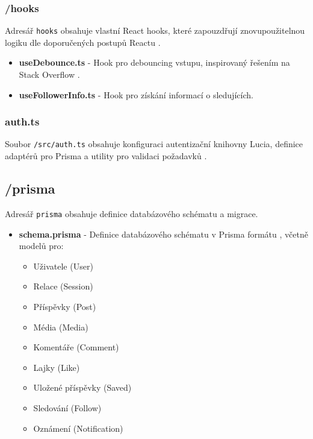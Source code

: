 \documentclass[12pt]{article}
\begin{document}
\subsubsection{/hooks}

Adresář \texttt{hooks} obsahuje vlastní React hooks, které zapouzdřují znovupoužitelnou logiku dle doporučených postupů Reactu \citep{React2023Hooks}.

\begin{itemize}
  \item \textbf{useDebounce.ts} - Hook pro debouncing vstupu, inspirovaný řešením na Stack Overflow \citep{StackOverflow2021}.
  \item \textbf{useFollowerInfo.ts} - Hook pro získání informací o sledujících.
\end{itemize}

\subsubsection{auth.ts}

Soubor \texttt{/src/auth.ts} obsahuje konfiguraci autentizační knihovny Lucia, definice adaptérů pro Prisma a utility pro validaci požadavků \citep{Lucia2023}.

\subsection{/prisma}

Adresář \texttt{prisma} obsahuje definice databázového schématu a migrace.

\begin{itemize}
  \item \textbf{schema.prisma} - Definice databázového schématu v Prisma formátu \citep{Prisma2023Schema}, včetně modelů pro:
  \begin{itemize}
    \item Uživatele (User)
    \item Relace (Session)
    \item Příspěvky (Post)
    \item Média (Media)
    \item Komentáře (Comment)
    \item Lajky (Like)
    \item Uložené příspěvky (Saved)
    \item Sledování (Follow)
    \item Oznámení (Notification)
  \end{itemize}
\end{itemize}
\end{document}
